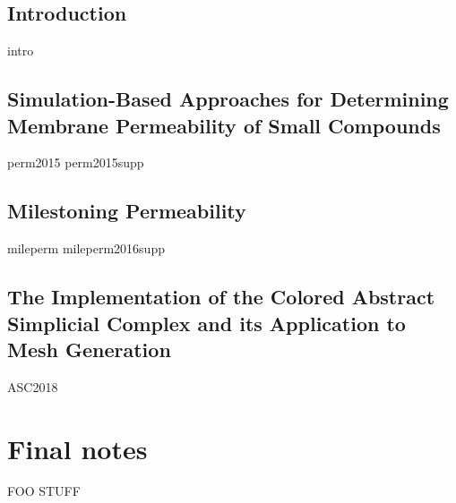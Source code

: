 \documentclass[11pt, chapterheads, draft]{ucsd}
\theoremstyle{definition}
\begin{document}
%


\begin{refsection}
\chapter{Introduction}
{intro}
\printbibliography[segment=\therefsegment,heading=subbibintoc]{}
\end{refsection}

\newpage
\begin{refsection}
\chapter{Simulation-Based Approaches for Determining Membrane Permeability of Small Compounds}\label{chap:permeability}
{perm2015}
{perm2015supp}
\printbibliography[segment=\therefsegment,heading=subbibintoc]{}
\end{refsection}

\newpage
\begin{refsection}
\chapter{Milestoning Permeability}\label{chap:mileperm}
{mileperm}
{mileperm2016supp}
\printbibliography[segment=\therefsegment,heading=subbibintoc]{}
\end{refsection}

\newpage
\begin{refsection}
\chapter{The Implementation of the Colored Abstract Simplicial Complex and its Application to Mesh Generation}\label{chap:asc}
{ASC2018}
\printbibliography[segment=\therefsegment,heading=subbibintoc]{}
\end{refsection}

\appendix
\chapter{Final notes}
FOO STUFF

% 
\end{document}
